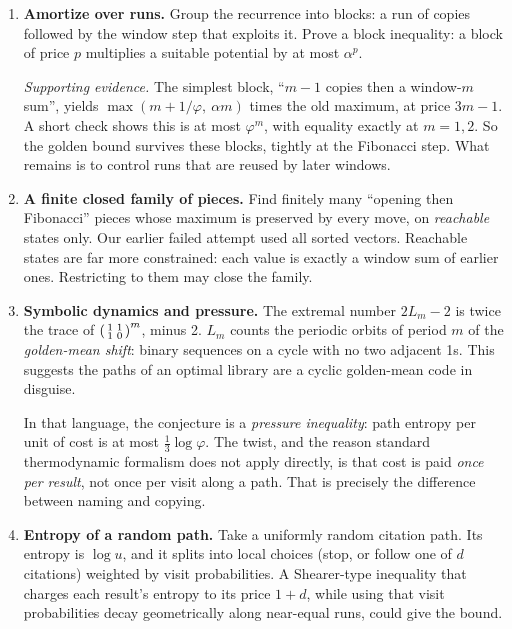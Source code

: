 \documentclass[11pt]{article}
\theoremstyle{remark}
\begin{document}
\begin{enumerate}
\item \textbf{Amortize over runs.} Group the recurrence into blocks: a run of copies
  followed by the window step that exploits it. Prove a block inequality: a block of
  price $p$ multiplies a suitable potential by at most $\alpha^p$.

  \emph{Supporting evidence.} The simplest block, ``$m-1$ copies then a window-$m$
  sum'', yields $\max(m+1/\varphi,\ \alpha m)$ times the old maximum, at price $3m-1$. A
  short check shows this is at most $\varphi^{m}$, with equality exactly at $m=1,2$. So
  the golden bound survives these blocks, tightly at the Fibonacci step. What remains is
  to control runs that are reused by later windows.
\item \textbf{A finite closed family of pieces.} Find finitely many ``opening then
  Fibonacci'' pieces whose maximum is preserved by every move, on \emph{reachable} states
  only. Our earlier failed attempt used all sorted vectors. Reachable states are far
  more constrained: each value is exactly a window sum of earlier ones. Restricting to
  them may close the family.
\item \textbf{Symbolic dynamics and pressure.} The extremal number $2L_m-2$ is twice the
  trace of $\begin{psmallmatrix}1&1\\1&0\end{psmallmatrix}^m$, minus 2. $L_m$ counts the
  periodic orbits of period $m$ of the \emph{golden-mean shift}: binary sequences on a
  cycle with no two adjacent 1s. This suggests the paths of an optimal library are a
  cyclic golden-mean code in disguise.

  In that language, the conjecture is a \emph{pressure inequality}: path entropy per unit
  of cost is at most $\tfrac13\log\varphi$. The twist, and the reason standard
  thermodynamic formalism does not apply directly, is that cost is paid \emph{once per
  result}, not once per visit along a path. That is precisely the difference between
  naming and copying.
\item \textbf{Entropy of a random path.} Take a uniformly random citation path. Its
  entropy is $\log u$, and it splits into local choices (stop, or follow one of $d$
  citations) weighted by visit probabilities. A Shearer-type inequality that charges each
  result's entropy to its price $1+d$, while using that visit probabilities decay
  geometrically along near-equal runs, could give the bound.
\end{enumerate}
\end{document}
